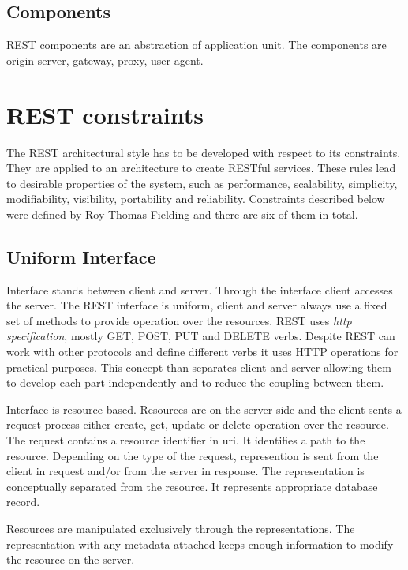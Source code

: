 \subsection{Components}
REST components are an abstraction of application unit. The components are origin server, gateway, proxy, user agent. %

\section{REST constraints}
\label{sec:constraints}

The REST architectural style has to be developed with respect to its constraints. They are applied to an architecture to create RESTful services. These rules lead to desirable properties of the system, such as performance, scalability, simplicity, modifiability, visibility, portability and reliability. Constraints described below were defined by Roy Thomas Fielding and there are six of them in total.

\subsection{Uniform Interface}
  
Interface stands between client and server. Through the interface client accesses the server. The REST interface is uniform, client and server always use a fixed set of methods to provide operation over the resources. REST uses \emph{\gls{http} specification}, mostly GET, POST, PUT and DELETE verbs. Despite REST can work with other protocols and define different verbs it uses HTTP operations for practical purposes. This concept than separates client and server allowing them to develop each part independently and to reduce the coupling between them. 

Interface is resource-based. Resources are on the server side and the client sents a request process either create, get, update or delete operation over the resource. The request contains a resource identifier in \gls{uri}. It identifies a path to the resource. Depending on the type of the request, represention is sent from the client in request and/or from the server in response. The representation is conceptually separated from the resource. It represents appropriate database record.

Resources are manipulated exclusively through the representations. The representation with any metadata attached keeps enough information to modify the resource on the server.

